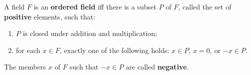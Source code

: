 A field $F$ is an \textbf{ordered field} iff there is a subset $P$ of $F$, called the set of \textbf{positive} elements, such that:
\begin{enumerate}
\item $P$ is closed under addition and multiplication;
\item for each $x \in F$, exactly one of the following holds: $x \in P$, $x = 0$, or $-x \in P$.
\end{enumerate}
The members $x$ of $F$ such that $-x \in P$ are called \textbf{negative}.
